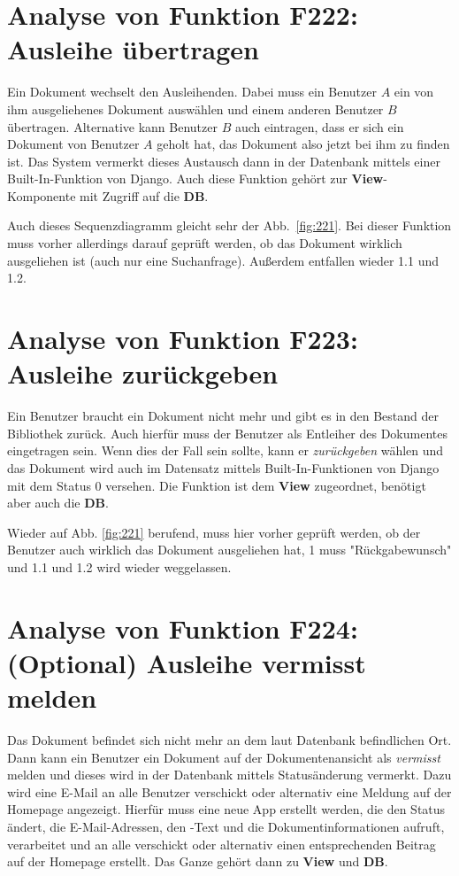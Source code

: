 \section{Analyse von Funktion F222: Ausleihe übertragen}
\label{f:222}
Ein Dokument wechselt den Ausleihenden. Dabei muss ein Benutzer $A$ ein von ihm ausgeliehenes Dokument auswählen und einem anderen Benutzer $B$ übertragen. Alternative kann Benutzer $B$ auch eintragen, dass er sich ein Dokument von Benutzer $A$ geholt hat, das Dokument also jetzt bei ihm zu finden ist. Das System vermerkt dieses Austausch dann in der Datenbank mittels einer Built-In-Funktion von Django. Auch diese Funktion gehört zur \textbf{View}-Komponente mit Zugriff auf die \textbf{DB}.

Auch dieses Sequenzdiagramm gleicht sehr der Abb.\ \ref{fig:221}. Bei dieser Funktion muss vorher allerdings darauf geprüft werden, ob das Dokument wirklich ausgeliehen ist (auch nur eine Suchanfrage). Außerdem entfallen wieder 1.1 und 1.2.

\section{Analyse von Funktion F223: Ausleihe zurückgeben}
\label{f:223}
Ein Benutzer braucht ein Dokument nicht mehr und gibt es in den Bestand der Bibliothek zurück. Auch hierfür muss der Benutzer als Entleiher des Dokumentes eingetragen sein. Wenn dies der Fall sein sollte, kann er \emph{zurückgeben} wählen und das Dokument wird auch im Datensatz mittels Built-In-Funktionen von Django mit dem Status 0 versehen. Die Funktion ist dem \textbf{View} zugeordnet, benötigt aber auch die \textbf{DB}.

Wieder auf Abb. \ref{fig:221} berufend, muss hier vorher geprüft werden, ob der Benutzer auch wirklich das Dokument ausgeliehen hat, 1 muss "Rückgabewunsch" und 1.1 und 1.2 wird wieder weggelassen.

\section{Analyse von Funktion F224: (Optional) Ausleihe vermisst melden}
\label{f:224}
Das Dokument befindet sich nicht mehr an dem laut Datenbank befindlichen Ort. Dann kann ein Benutzer ein Dokument auf der Dokumentenansicht als \emph{vermisst} melden und dieses wird in der Datenbank mittels Statusänderung vermerkt. Dazu wird eine E-Mail an alle Benutzer verschickt oder alternativ eine Meldung auf der Homepage angezeigt. Hierfür muss eine neue App erstellt werden, die den Status ändert, die E-Mail-Adressen, den -Text und die Dokumentinformationen aufruft, verarbeitet und an alle verschickt oder alternativ einen entsprechenden Beitrag auf der Homepage erstellt. Das Ganze gehört dann zu \textbf{View} und \textbf{DB}.

